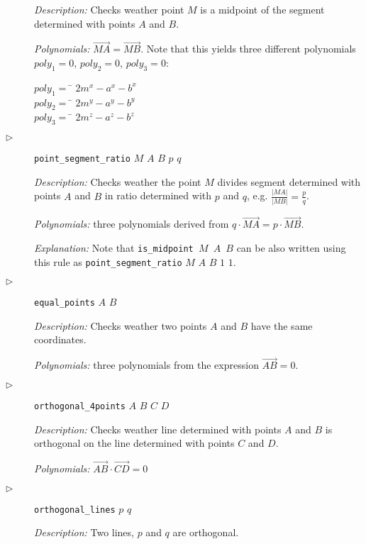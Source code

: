 \documentclass[final,1p,times,authoryear]{elsarticle}
\begin{document}
\begin{description}
{\em Description:} Checks weather point $M$ is a midpoint of the
segment determined with points $A$ and $B$.

{\em Polynomials:} $\overrightarrow{MA} = \overrightarrow{MB}$.  Note
that this yields three different polynomials $poly_1 = 0$,
$poly_2 = 0$, $poly_3 = 0$:

\begin{tabbing}
$poly_1 = $ \= $2m^x - a^x - b^x$ \\ 
$poly_2 = $ \= $2m^y - a^y - b^y$ \\ 
$poly_3 = $ \= $2m^z - a^z - b^z$
\end{tabbing}

\item[$\triangleright$] {\tt point\_segment\_ratio} $M$ $A$ $B$ $p$ $q$

{\em Description:} Checks weather the point $M$ divides segment
determined with points $A$ and $B$ in ratio determined with $p$ and
$q$, e.g. $\frac{|MA|}{|MB|} = \frac{p}{q}$.

{\em Polynomials:} three polynomials derived from
$q\cdot \overrightarrow{MA} = p\cdot \overrightarrow{MB}$.

{\em Explanation:} Note that {\tt is\_midpoint $M$ $A$ $B$} can be
also written using this rule as {\tt point\_segment\_ratio} $M$ $A$
$B$ $1$ $1$.

\item[$\triangleright$] {\tt equal\_points} $A$ $B$

{\em Description:} Checks weather two points $A$ and $B$ have the same
coordinates.

{\em Polynomials:} three polynomials from the expression
$\overrightarrow{AB} = 0$.

\item[$\triangleright$] {\tt orthogonal\_4points} $A$ $B$ $C$ $D$

{\em Description:} Checks weather line determined with points $A$
and $B$ is orthogonal on the line determined with points $C$ and
$D$.

{\em Polynomials:} $\overrightarrow{AB} \cdot \overrightarrow{CD} = 0$

\item[$\triangleright$] {\tt orthogonal\_lines} $p$ $q$

{\em Description:} Two lines, $p$ and $q$ are orthogonal.


\end{description}
\end{document}
